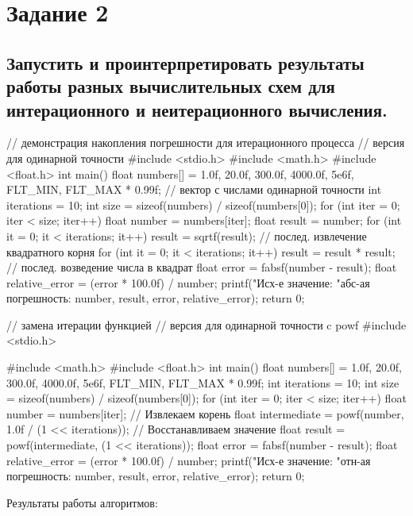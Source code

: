 \documentclass{report}
\begin{document}
	\chapter{Задание 2}
	\section{Запустить и проинтерпретировать результаты работы разных вычислительных схем для
		интерационного и неитерационного вычисления.}
	
	\begin{code}
// демонстрация накопления погрешности для итерационного процесса
// версия для одинарной точности
#include <stdio.h>
#include <math.h>
#include <float.h>
int main() {
	float numbers[] = {1.0f, 20.0f, 300.0f, 4000.0f, 5e6f,
		FLT_MIN, FLT_MAX * 0.99f};
	// вектор с числами одинарной точности
	int iterations = 10;
	int size = sizeof(numbers) / sizeof(numbers[0]);
	for (int iter = 0; iter < size; iter++) {
		float number = numbers[iter];
		float result = number;
		for (int it = 0; it < iterations; it++)
		result = sqrtf(result);
		// послед. извлечение квадратного корня
		for (int it = 0; it < iterations; it++)
		result = result * result;
		// послед. возведение числа в квадрат
		float error = fabsf(number - result);
		float relative_error = (error * 100.0f) / number;
		printf("Исх-е значение: %
		"абс-ая погрешность: %
		number, result, error, relative_error);
	}
	return 0;
}
\end{code}
\begin{code}
// замена итерации функцией
// версия для одинарной точности c powf
#include <stdio.h>

#include <math.h>
#include <float.h>
int main() {
	float numbers[] = {1.0f, 20.0f, 300.0f, 4000.0f, 5e6f,
		FLT_MIN, FLT_MAX * 0.99f};
	int iterations = 10;
	int size = sizeof(numbers) / sizeof(numbers[0]);
	for (int iter = 0; iter < size; iter++) {
		float number = numbers[iter];
		// Извлекаем корень
		float intermediate = powf(number, 1.0f / (1 << iterations));
		// Восстанавливаем значение
		float result = powf(intermediate, (1 << iterations));
		float error = fabsf(number - result);
		float relative_error = (error * 100.0f) / number;
		printf("Исх-е значение: %
		"отн-ая погрешность: %
		number, result, error, relative_error);
	}
	return 0;
}
	\end{code}
	
	Результаты работы алгоритмов:
	
\end{document}
